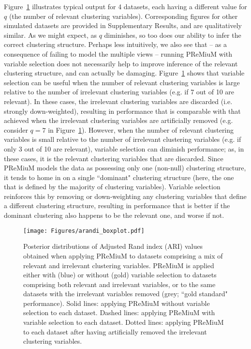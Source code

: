 \documentclass[12pt]{article}
\begin{document}
Figure~\ref{fig03} illustrates typical output for 4 datasets, each having a different value for $q$ (the number of relevant clustering variables).  Corresponding figures for other simulated datasets are provided in Supplementary Results, and are qualitatively similar.  As we might expect, as $q$ diminishes, so too does our ability to infer the correct clustering structure.  Perhaps less intuitively, we also see that -- as a consequence of failing to model the multiple views --  running PReMiuM with variable selection does not necessarily help to improve inference of the relevant clustering structure, and can actually be damaging.  Figure~\ref{fig03} shows that variable selection can be useful when the number of relevant clustering variables is large relative to the number of irrelevant clustering variables (e.g. if 7 out of 10 are relevant).  In these cases, the irrelevant clustering variables are discarded (i.e. strongly down-weighted), resulting in performance that is comparable with that achieved when the irrelevant clustering variables are artificially removed (e.g. consider $q = 7$ in Figure~\ref{fig03}).  However, when the number of relevant clustering variables is small relative to the number of irrelevant clustering variables (e.g. if only 3 out of 10 are relevant), variable selection can diminish performance;  as, in these cases, it is the relevant clustering variables that are discarded.    Since PReMiuM models the data as possessing only one (non-null) clustering structure, it tends to home in on a single ``dominant" clustering structure (here, the one that is defined by the majority of clustering variables).  Variable selection reinforces this by removing or down-weighting any clustering variables that define a different clustering structure, resulting in performance that is better if the dominant clustering also happens to be the relevant one, and worse if not.  
 \begin{figure}[!h]
    \centering
\texttt{[image: Figures/arandi\_boxplot.pdf]}
        \caption{Posterior distributions of Adjusted Rand index (ARI) values obtained when applying PReMiuM to datasets comprising a mix of relevant and irrelevant clustering variables.  PReMiuM is applied either with (blue) or without (gold) variable selection to datasets comprising both relevant and irrelevant variables, or to the same datasets with the irrelevant variables removed (grey; ``gold standard" performance).  
        Solid lines: applying PReMiuM without variable selection to each dataset.  Dashed lines: applying PReMiuM with variable selection to each dataset.  Dotted lines: applying PReMiuM to each dataset after having artificially removed the irrelevant clustering variables.}
        \label{fig03}
\end{figure}
\end{document}

